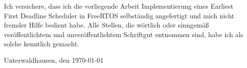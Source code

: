 \documentclass[../EDF Master Thesis.tex]{subfiles}
\begin{document}
    Ich versichere, dass ich die vorliegende Arbeit \glqq{}Implementierung eines Earliest First Deadline Scheduler in FreeRTOS\grqq{} selbständig angefertigt und mich nicht fremder Hilfe bedient habe.
    Alle Stellen, die wörtlich oder sinngemäß veröffentlichtem und unveröffentlichtem Schriftgut entnommen sind, habe ich als solche kenntlich gemacht.
    \vspace{1.5cm}


    Unterwaldhausen, den \today
    \begin{flushleft}
        \makebox[.4\textwidth]{}\\
        \makebox[.4\textwidth]{\hrulefill}\\
    \end{flushleft}
\end{document}
